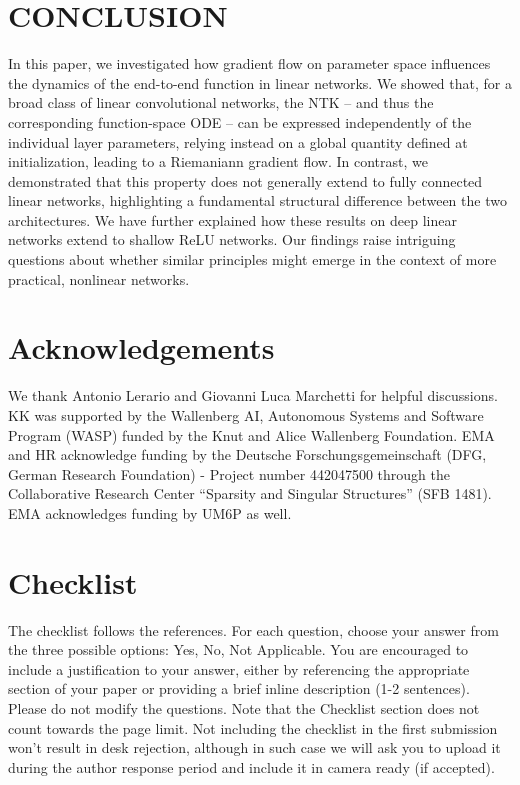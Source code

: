 \documentclass[twoside]{article}
\theoremstyle{definition}
\theoremstyle{remark}
\begin{document}
\section{CONCLUSION}
In this paper, we investigated how gradient flow on parameter space influences the dynamics of the end-to-end function in linear networks. We showed that, for a broad class of linear convolutional networks, the NTK -- and thus the corresponding function-space ODE -- can be expressed independently of the individual layer parameters, relying instead on a global quantity defined at initialization, leading to a Riemaniann gradient flow.
In contrast, we demonstrated that this property does not generally extend to fully connected linear networks, highlighting a fundamental structural difference between the two architectures. 
We have further explained how these results on deep linear networks extend to shallow ReLU networks. 
Our findings raise intriguing questions about whether similar principles might emerge in the context of more practical, nonlinear networks.

\section*{Acknowledgements}
We thank Antonio Lerario and Giovanni Luca Marchetti for helpful discussions.
 KK was supported by the Wallenberg AI, Autonomous Systems and Software Program (WASP) funded by the Knut and Alice Wallenberg Foundation.
 EMA and HR acknowledge funding by the Deutsche Forschungsgemeinschaft (DFG, German Research Foundation) - Project number 442047500 through the Collaborative Research Center ``Sparsity and Singular Structures'' (SFB 1481). EMA acknowledges funding by UM6P as well.






\newpage 

\section*{Checklist}


The checklist follows the references. For each question, choose your answer from the three possible options: Yes, No, Not Applicable.  You are encouraged to include a justification to your answer, either by referencing the appropriate section of your paper or providing a brief inline description (1-2 sentences). 
Please do not modify the questions.  Note that the Checklist section does not count towards the page limit. Not including the checklist in the first submission won't result in desk rejection, although in such case we will ask you to upload it during the author response period and include it in camera ready (if accepted).
\end{document}
